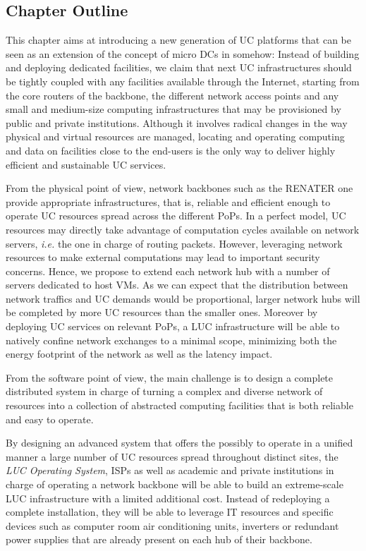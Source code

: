 \subsection{Chapter Outline}

This chapter aims at introducing a new generation of UC platforms that can be seen as an extension of the concept of micro DCs in somehow: 
Instead of building and deploying dedicated facilities, we claim that next UC
infrastructures should be tightly coupled with any facilities available through
the Internet, starting from the core routers of the backbone, the different
network access points and any small and medium-size computing infrastructures
that may be provisioned by public and private institutions. 
 Although it involves radical changes in the way
physical and virtual resources are managed, locating and operating computing and data on
facilities close to the end-users is the only way to deliver highly efficient
and sustainable UC services. 

From the physical point of view, network backbones such as the RENATER one provide
appropriate infrastructures, that is, reliable and efficient enough to operate UC
resources spread across the different PoPs. In a perfect model, UC resources may directly
take advantage of computation cycles available on network servers, \textit{i.e.} the one
in charge of routing packets. However, leveraging network resources to make external
computations may lead to important security concerns. Hence, we propose to extend each
network hub with a number of servers dedicated to host VMs. As we can expect that the
distribution between network traffics and UC demands would be proportional, larger network
hubs will be completed by more UC resources than the smaller ones. Moreover by deploying
UC services on relevant PoPs, a LUC infrastructure will be able to natively confine
network exchanges to a minimal scope, minimizing both the energy footprint of the network
as well as the latency impact.

From the software point of view, the main challenge is to design a complete distributed
system in charge of turning a complex and diverse network of resources into a collection
of abstracted computing facilities that is both reliable and easy to operate.

\begin{svgraybox}
By designing an advanced system that offers the possibly to operate  in a unified manner a large number of UC resources spread throughout distinct sites, \ie the \emph{LUC Operating System},
ISPs as well as academic and private institutions in
charge of operating a network backbone will be able to build an extreme-scale
LUC infrastructure with a limited additional cost. Instead of redeploying a
complete installation, they will be able to leverage IT resources and
specific devices such as computer room air conditioning units, inverters or
redundant power supplies that are already present on each hub of their
backbone. 
\end{svgraybox}


